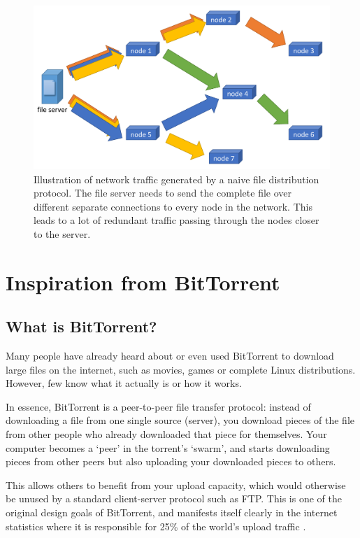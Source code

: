 \documentclass[ DIV=calc,%
                paper=a4,%
                fontsize=12pt,%
                twocolumn%
              ]{scrartcl}	 			%
\begin{document}
\begin{figure}
    \centering
    \includegraphics[width=\columnwidth]{diagrams/ftp_diagram.pdf}
    \caption{Illustration of network traffic generated by a naive file distribution protocol. The file server needs to send the complete file over different separate connections to every node in the network. This leads to a lot of redundant traffic passing through the nodes closer to the server.}
    \label{fig:ftp_traffic}
\end{figure}

\section*{Inspiration from BitTorrent}
\subsection*{What is BitTorrent?}
Many people have already heard about or even used BitTorrent to download large files on the internet, such as movies, games or complete Linux distributions. However, few know what it actually is or how it works.

In essence, BitTorrent is a peer-to-peer file transfer protocol: instead of downloading a file from one single source (server), you download pieces of the file from other people who already downloaded that piece for themselves. Your computer becomes a `peer' in the torrent's `swarm', and starts downloading pieces from other peers but also uploading your downloaded pieces to others.

This allows others to benefit from your upload capacity, which would otherwise be unused by a standard client-server protocol such as FTP. This is one of the original design goals of BitTorrent, and manifests itself clearly in the internet statistics where it is responsible for 25\% of the world's upload traffic \cite{sandvine}.
\end{document}
